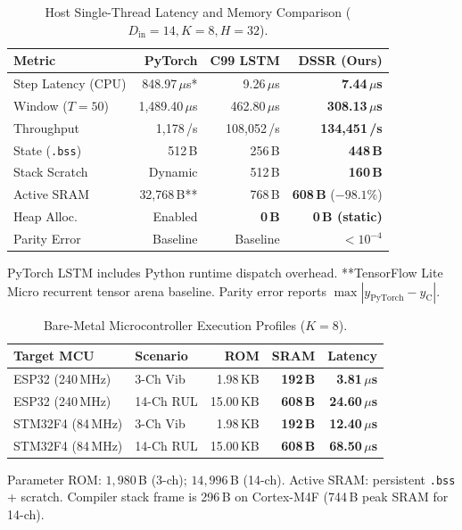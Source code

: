\documentclass[10pt,twocolumn,a4paper]{article}
\theoremstyle{plain}
\theoremstyle{definition}
\begin{document}
\begin{table}[t]
\centering
\caption{Host Single-Thread Latency and Memory Comparison ($D_{\mathrm{in}}=14, K=8, H=32$).}
\label{tab:host_perf}
\footnotesize
\setlength{\tabcolsep}{3.5pt}
\begin{tabular*}{\columnwidth}{@{\extracolsep{\fill}}lrrr@{}}
\toprule
\textbf{Metric} & \textbf{PyTorch} & \textbf{C99 LSTM} & \textbf{DSSR (Ours)} \\
\midrule
Step Latency (CPU) & 848.97\,$\mu$s* & 9.26\,$\mu$s & \textbf{7.44\,$\mu$s} \\
Window ($T=50$) & 1,489.40\,$\mu$s & 462.80\,$\mu$s & \textbf{308.13\,$\mu$s} \\
Throughput & 1,178\,/s & 108,052\,/s & \textbf{134,451\,/s} \\
State (\texttt{.bss}) & 512\,B & 256\,B & \textbf{448\,B} \\
Stack Scratch & Dynamic & 512\,B & \textbf{160\,B} \\
Active SRAM & 32,768\,B** & 768\,B & \textbf{608\,B} ($-98.1\%$) \\
Heap Alloc. & Enabled & \textbf{0\,B} & \textbf{0\,B (static)} \\
Parity Error & Baseline & Baseline & $<10^{-4}$ \\
\bottomrule
\end{tabular*}
\begin{minipage}{\columnwidth}
\vspace{3pt}
\scriptsize *PyTorch LSTM includes Python runtime dispatch overhead. **TensorFlow Lite Micro recurrent tensor arena baseline. Parity error reports $\max |y_{\mathrm{PyTorch}} - y_{\mathrm{C}}|$.
\end{minipage}
\end{table}

\begin{table}[t]
\centering
\caption{Bare-Metal Microcontroller Execution Profiles ($K=8$).}
\label{tab:mcu_perf}
\footnotesize
\setlength{\tabcolsep}{3pt}
\begin{tabular*}{\columnwidth}{@{\extracolsep{\fill}}llrrr@{}}
\toprule
\textbf{Target MCU} & \textbf{Scenario} & \textbf{ROM} & \textbf{SRAM} & \textbf{Latency} \\
\midrule
ESP32 (240\,MHz)   & 3-Ch Vib  & 1.98\,KB  & \textbf{192\,B} & \textbf{3.81\,$\mu$s} \\
ESP32 (240\,MHz)   & 14-Ch RUL & 15.00\,KB & \textbf{608\,B} & \textbf{24.60\,$\mu$s} \\
STM32F4 (84\,MHz)  & 3-Ch Vib  & 1.98\,KB  & \textbf{192\,B} & \textbf{12.40\,$\mu$s} \\
STM32F4 (84\,MHz)  & 14-Ch RUL & 15.00\,KB & \textbf{608\,B} & \textbf{68.50\,$\mu$s} \\
\bottomrule
\end{tabular*}
\begin{minipage}{\columnwidth}
\vspace{3pt}
\scriptsize Parameter ROM: $1{,}980$\,B (3-ch); $14{,}996$\,B (14-ch). Active SRAM: persistent \texttt{.bss} + scratch. Compiler stack frame is 296\,B on Cortex-M4F (744\,B peak SRAM for 14-ch).
\end{minipage}
\end{table}
\end{document}
